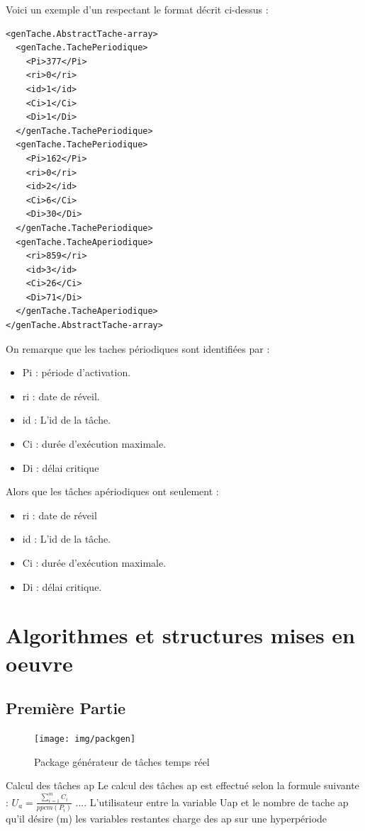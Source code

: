 Voici un exemple d'un respectant le format décrit ci-dessus : 

\begin{lstlisting}
<genTache.AbstractTache-array>
  <genTache.TachePeriodique>
    <Pi>377</Pi>
    <ri>0</ri>
    <id>1</id>
    <Ci>1</Ci>
    <Di>1</Di>
  </genTache.TachePeriodique>
  <genTache.TachePeriodique>
    <Pi>162</Pi>
    <ri>0</ri>
    <id>2</id>
    <Ci>6</Ci>
    <Di>30</Di>
  </genTache.TachePeriodique>
  <genTache.TacheAperiodique>
    <ri>859</ri>
    <id>3</id>
    <Ci>26</Ci>
    <Di>71</Di>
  </genTache.TacheAperiodique>
</genTache.AbstractTache-array>
\end{lstlisting}
On remarque que les taches périodiques sont identifiées par : 
\begin{itemize}
\item
Pi : période d'activation.
\item
ri : date de réveil.
\item
id : L'id de la tâche.
\item
Ci : durée d'exécution maximale.
\item
Di  : délai critique
\end{itemize} 
Alors que les tâches apériodiques ont seulement : 
\begin{itemize}
\item
ri  : date de réveil
\item
id : L'id de la tâche.
\item
Ci : durée d'exécution maximale.
\item
Di : délai critique.
\end{itemize} 
\section{Algorithmes et structures mises en oeuvre}
\subsection{Première Partie}
   \begin{figure}[htbp]
  \centering
  \texttt{[image: img/packgen]}
  \caption{Package générateur de tâches temps réel}
  \label{fig:gen}
\end{figure}

Calcul des tâches ap  
Le calcul des tâches ap est effectué selon la formule suivante : $ U_a =  \frac{\sum_{i=1}^m C_i}{ppcm(P_i)}$   ....  L'utilisateur entre la variable Uap  et le nombre de tache ap qu'il désire (m) les variables restantes 
charge des ap sur une hyperpériode 

